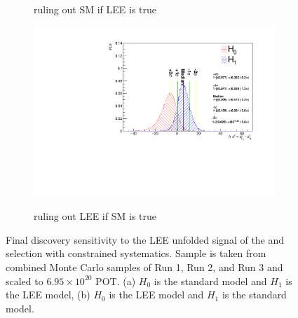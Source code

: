 \begin{figure}[H]
\begin{center}
\begin{subfigure}{0.45\textwidth}
    \label{fig:sensitivity_bdt_loose_const}
    \caption{ruling out SM if LEE is true}
    \end{subfigure}
    \begin{subfigure}{0.45\textwidth}
    \includegraphics[width=1.00\textwidth]{Sensitivity/sensitivity-run123/SBNfit_Cls_nue_1e0p_numu_reco_e_H1_mc_collab_syst_detsys_exclusionCNP_Chi.pdf}
    \label{fig:sensitivity_bdt_loose_const}
    \caption{ruling out LEE if SM is true}
    \end{subfigure}
    \caption{\label{fig:constrained_sensitivity}Final discovery sensitivity to the LEE unfolded signal of the \npsel and \zpsel selection with constrained systematics. Sample is taken from combined Monte Carlo samples of Run 1, Run 2, and Run 3 and scaled to $6.95\times10^20$ POT.  (a) $H_0$ is the standard model and $H_1$ is the LEE model, (b) $H_0$ is the LEE model and $H_1$ is the standard model.}
    \end{center}
\end{figure}


